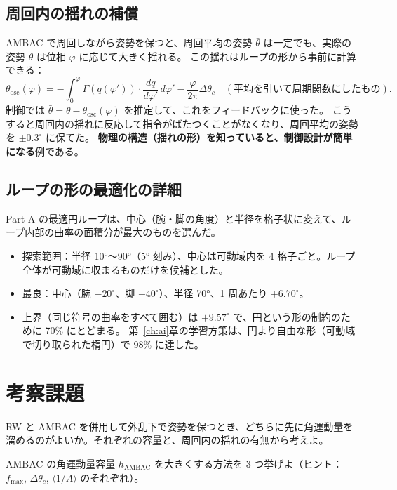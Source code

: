 \subsection{周回内の揺れの補償}

AMBAC で周回しながら姿勢を保つと、周回平均の姿勢 $\bar\theta$ は一定でも、実際の姿勢 $\theta$ は位相 $\varphi$ に応じて大きく揺れる。
この揺れはループの形から事前に計算できる：
\begin{equation}
\theta_{\mathrm{osc}}(\varphi) = -\int_0^\varphi\Gamma(q(\varphi'))\cdot\frac{dq}{d\varphi'}\,d\varphi' - \frac{\varphi}{2\pi}\Delta\theta_c\quad(\text{平均を引いて周期関数にしたもの}).
\end{equation}
制御では $\bar\theta = \theta-\theta_{\mathrm{osc}}(\varphi)$ を推定して、これをフィードバックに使った。
こうすると周回内の揺れに反応して指令がばたつくことがなくなり、周回平均の姿勢を $\pm0.3^\circ$ に保てた。
\textbf{物理の構造（揺れの形）を知っていると、制御設計が簡単になる}例である。

\subsection{ループの形の最適化の詳細}

Part A の最適円ループは、中心（腕・脚の角度）と半径を格子状に変えて、ループ内部の曲率の面積分が最大のものを選んだ。
\begin{itemize}
\item 探索範囲：半径 10°〜90°（5° 刻み）、中心は可動域内を 4 格子ごと。ループ全体が可動域に収まるものだけを候補とした。
\item 最良：中心（腕 $-20^\circ$、脚 $-40^\circ$）、半径 70°、1 周あたり $+6.70^\circ$。
\item 上界（同じ符号の曲率をすべて囲む）は $+9.57^\circ$ で、円という形の制約のために 70\% にとどまる。
  第~\ref{ch:ai}章の学習方策は、円より自由な形（可動域で切り取られた楕円）で 98\% に達した。
\end{itemize}

\section*{考察課題}
\begin{exercise}
RW と AMBAC を併用して外乱下で姿勢を保つとき、どちらに先に角運動量を溜めるのがよいか。それぞれの容量と、周回内の揺れの有無から考えよ。
\end{exercise}
\begin{exercise}
AMBAC の角運動量容量 $h_{\mathrm{AMBAC}}$ を大きくする方法を 3 つ挙げよ（ヒント：$f_{\max}$, $\Delta\theta_c$, $\langle1/A\rangle$ のそれぞれ）。
\end{exercise}

